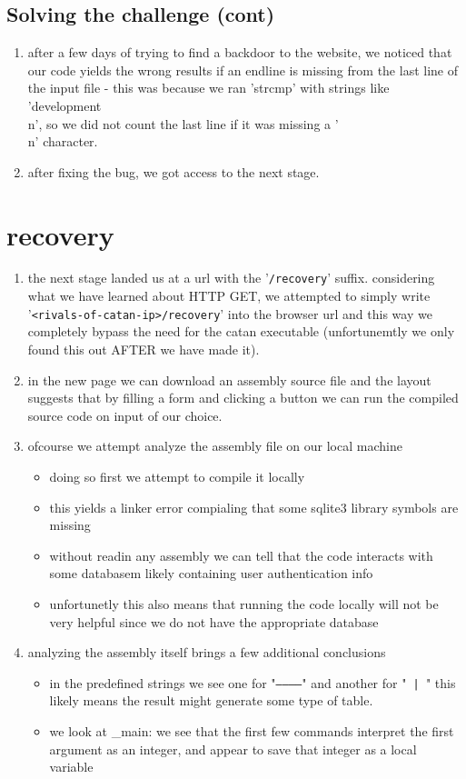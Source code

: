 \documentclass{article}
\begin{document}
\subsection{Solving the challenge (cont)}
\begin{enumerate}
	\item after a few days of trying to find a backdoor to the website, we noticed that our code yields the wrong results
		if an endline is missing from the last line of the input file - this was because we ran 'strcmp' with strings like 'development\\n',
		so we did not count the last line if it was missing a '\\n' character.
	\item after fixing the bug, we got access to the next stage.
\end{enumerate}

\section{recovery}
\begin{enumerate}
	\item the next stage landed us at a url with the '\texttt{/recovery}' suffix.
		considering what we have learned about HTTP GET, we attempted to simply write '\texttt{<rivals-of-catan-ip>/recovery}' into
		the browser url and this way we completely bypass the need for the catan executable (unfortunemtly we only found this out AFTER we have made it).
	\item in the new page we can download an assembly source file and the layout suggests that by filling a form
		and clicking a button we can run the compiled source code on input of our choice.
	\item ofcourse we attempt analyze the assembly file on our local machine
    \begin{itemize}
		\item doing so first we attempt to compile it locally
		\item this yields a linker error compialing that some sqlite3 library symbols are missing
		\item without readin any assembly we can tell that the code interacts with some databasem likely containing user authentication info
		\item unfortunetly this also means that running the code locally will not be very helpful since we do not have the appropriate database
	\end{itemize}
    \item analyzing the assembly itself brings a few additional conclusions
    \begin{itemize}
		\item in the predefined strings we see one for "\texttt{------------}" and another for "\texttt{ | }" this likely means
			the result might generate some type of table.
		\item we look at \_main: we see that the first few commands interpret the first argument as an integer,
			and appear to save that integer as a local variable
    \end{itemize}
\end{enumerate}
\end{document}
